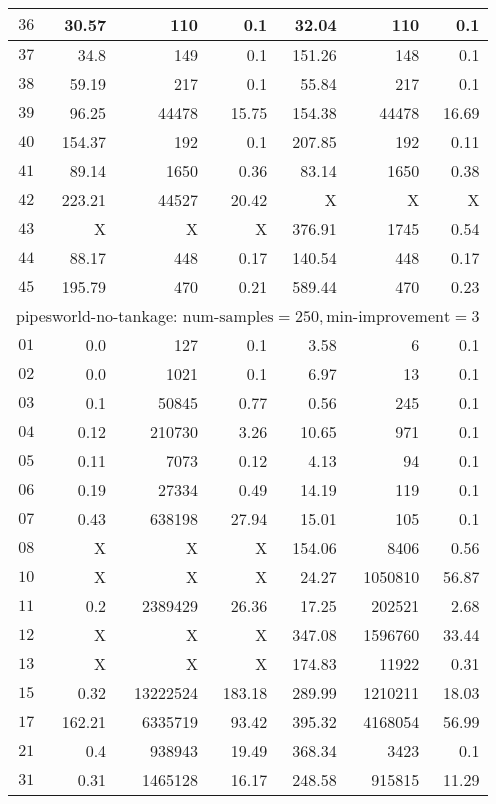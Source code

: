 \begin{longtable}{|c||r|r|r||r|r|r|}
$36$ & 30.57 & 110 & 0.1 &32.04 & 110 & 0.1 \\\hline
$37$ & 34.8 & 149 & 0.1 &151.26 & 148 & 0.1 \\\hline
$38$ & 59.19 & 217 & 0.1 &55.84 & 217 & 0.1 \\\hline
$39$ & 96.25 & 44478 & 15.75 &154.38 & 44478 & 16.69 \\\hline
$40$ & 154.37 & 192 & 0.1 &207.85 & 192 & 0.11 \\\hline
$41$ & 89.14 & 1650 & 0.36 &83.14 & 1650 & 0.38 \\\hline
$42$ & 223.21 & 44527 & 20.42 &X & X & X \\\hline
$43$ & X & X & X &376.91 & 1745 & 0.54 \\\hline
$44$ & 88.17 & 448 & 0.17 &140.54 & 448 & 0.17 \\\hline
$45$ & 195.79 & 470 & 0.21 &589.44 & 470 & 0.23 \\\hline

\multicolumn{7}{|l|}{pipesworld-no-tankage: $\text{num-samples}=250,\text{min-improvement}=3$}\\\hline
$01$ & 0.0 & 127 & 0.1 &3.58 & 6 & 0.1 \\\hline
$02$ & 0.0 & 1021 & 0.1 &6.97 & 13 & 0.1 \\\hline
$03$ & 0.1 & 50845 & 0.77 &0.56 & 245 & 0.1 \\\hline
$04$ & 0.12 & 210730 & 3.26 &10.65 & 971 & 0.1 \\\hline
$05$ & 0.11 & 7073 & 0.12 &4.13 & 94 & 0.1 \\\hline
$06$ & 0.19 & 27334 & 0.49 &14.19 & 119 & 0.1 \\\hline
$07$ & 0.43 & 638198 & 27.94 &15.01 & 105 & 0.1 \\\hline
$08$ & X & X & X &154.06 & 8406 & 0.56 \\\hline
$10$ & X & X & X &24.27 & 1050810 & 56.87 \\\hline
$11$ & 0.2 & 2389429 & 26.36 &17.25 & 202521 & 2.68 \\\hline
$12$ & X & X & X &347.08 & 1596760 & 33.44 \\\hline
$13$ & X & X & X &174.83 & 11922 & 0.31 \\\hline
$15$ & 0.32 & 13222524 & 183.18 &289.99 & 1210211 & 18.03 \\\hline
$17$ & 162.21 & 6335719 & 93.42 &395.32 & 4168054 & 56.99 \\\hline
$21$ & 0.4 & 938943 & 19.49 &368.34 & 3423 & 0.1 \\\hline
$31$ & 0.31 & 1465128 & 16.17 &248.58 & 915815 & 11.29 \\\hline


\end{longtable}
